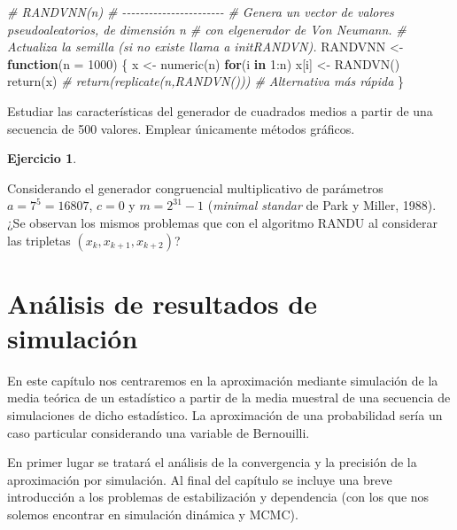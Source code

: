 \documentclass[
]{book}
\newenvironment{Shaded}{\begin{snugshade}}{\end{snugshade}}
\newcommand{\AttributeTok}[1]{\textcolor[rgb]{0.77,0.63,0.00}{#1}}
\newcommand{\CommentTok}[1]{\textcolor[rgb]{0.56,0.35,0.01}{\textit{#1}}}
\newcommand{\ControlFlowTok}[1]{\textcolor[rgb]{0.13,0.29,0.53}{\textbf{#1}}}
\newcommand{\DecValTok}[1]{\textcolor[rgb]{0.00,0.00,0.81}{#1}}
\newcommand{\FunctionTok}[1]{\textcolor[rgb]{0.00,0.00,0.00}{#1}}
\newcommand{\NormalTok}[1]{#1}
\newcommand{\OtherTok}[1]{\textcolor[rgb]{0.56,0.35,0.01}{#1}}
\newcommand{\SpecialCharTok}[1]{\textcolor[rgb]{0.00,0.00,0.00}{#1}}
\theoremstyle{break}
\theoremstyle{definition}
\theoremstyle{definition}
\theoremstyle{definition}
\newtheorem{exercise}{Ejercicio}[chapter]
\theoremstyle{definition}
\theoremstyle{remark}
\begin{document}
\begin{Shaded}
\begin{Highlighting}[]
\CommentTok{\# RANDVNN(n)}
\CommentTok{\# {-}{-}{-}{-}{-}{-}{-}{-}{-}{-}{-}{-}{-}{-}{-}{-}{-}{-}{-}{-}{-}{-}{-}}
\CommentTok{\#   Genera un vector de valores pseudoaleatorios, de dimensión \textasciigrave{}n\textasciigrave{} }
\CommentTok{\#   con elgenerador de Von Neumann.}
\CommentTok{\#   Actualiza la semilla (si no existe llama a initRANDVN).}
\NormalTok{RANDVNN }\OtherTok{\textless{}{-}} \ControlFlowTok{function}\NormalTok{(}\AttributeTok{n =} \DecValTok{1000}\NormalTok{) \{}
\NormalTok{    x }\OtherTok{\textless{}{-}} \FunctionTok{numeric}\NormalTok{(n)}
    \ControlFlowTok{for}\NormalTok{(i }\ControlFlowTok{in} \DecValTok{1}\SpecialCharTok{:}\NormalTok{n) x[i] }\OtherTok{\textless{}{-}} \FunctionTok{RANDVN}\NormalTok{()}
    \FunctionTok{return}\NormalTok{(x)}
    \CommentTok{\# return(replicate(n,RANDVN()))  \# Alternativa más rápida}
\NormalTok{\}}
\end{Highlighting}
\end{Shaded}

Estudiar las características del generador de cuadrados medios a partir de una secuencia de 500 valores.
Emplear únicamente métodos gráficos.

\begin{exercise}
\protect\hypertarget{exr:parkmiller}{}{\label{exr:parkmiller} }
\end{exercise}
Considerando el generador congruencial multiplicativo de parámetros \(a=7^{5}=16807\), \(c=0\) y \(m=2^{31}-1\) (\emph{minimal standar} de Park y Miller, 1988).
¿Se observan los mismos problemas que con el algoritmo RANDU al considerar las tripletas \((x_{k},x_{k+1},x_{k+2})\)?

\hypertarget{cap4}{%
\chapter{Análisis de resultados de simulación}\label{cap4}}

En este capítulo nos centraremos en la aproximación mediante simulación de la media teórica de un estadístico a partir de la media muestral de una secuencia de simulaciones de dicho estadístico.
La aproximación de una probabilidad sería un caso particular considerando una variable de Bernouilli.

En primer lugar se tratará el análisis de la convergencia y la precisión de la aproximación por simulación.
Al final del capítulo se incluye una breve introducción a los problemas de estabilización y dependencia (con los que nos solemos encontrar en simulación dinámica y MCMC).
\end{document}
